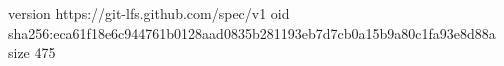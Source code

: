 version https://git-lfs.github.com/spec/v1
oid sha256:eca61f18e6c944761b0128aad0835b281193eb7d7cb0a15b9a80c1fa93e8d88a
size 475
